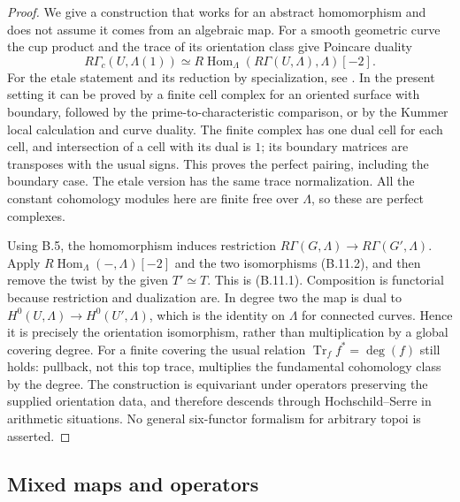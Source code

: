 \begin{proof}
We give a construction that works for an abstract
homomorphism and does not assume it comes from an
algebraic map. For a smooth geometric curve the cup product
and the trace of its orientation class give Poincare
duality
\[
 R\Gamma_c(U,\Lambda(1))\simeq
 R\operatorname{Hom}_\Lambda(R\Gamma(U,\Lambda),\Lambda)[-2].
                                                               \tag{B.11.2}
\]
For the etale statement and its reduction by specialization,
see \citet[VI, Theorem~2.2 and its proof]{DeligneArcata1977}.
In the present setting it can be proved by a finite cell
complex for an oriented surface with boundary, followed
by the prime-to-characteristic comparison, or by the
Kummer local calculation and curve duality. The finite
complex has one dual cell for each cell, and intersection
of a cell with its dual is $1$; its boundary matrices are
transposes with the usual signs. This proves the perfect
pairing, including the boundary case. The etale version
has the same trace normalization. All the constant
cohomology modules here are finite free over $\Lambda$,
so these are perfect complexes.

Using B.5, the homomorphism induces restriction
$R\Gamma(G,\Lambda)\to R\Gamma(G',\Lambda)$.
Apply $R\operatorname{Hom}_\Lambda(-,\Lambda)[-2]$ and the
two isomorphisms (B.11.2), and then remove the twist by
the given $T'\simeq T$. This is (B.11.1). Composition is
functorial because restriction and dualization are. In
degree two the map is dual to
$H^0(U,\Lambda)\to H^0(U',\Lambda)$, which is the identity
on $\Lambda$ for connected curves. Hence it is precisely
the orientation isomorphism, rather than multiplication
by a global covering degree. For a finite covering the
usual relation $\operatorname{Tr}_f f^*=\deg(f)$ still
holds: pullback, not this top trace, multiplies the
fundamental cohomology class by the degree. The construction
is equivariant under operators preserving the supplied
orientation data, and therefore descends through
Hochschild--Serre in arithmetic situations. No general
six-functor formalism for arbitrary topoi is asserted.
\end{proof}

\subsection{Mixed maps and operators}

